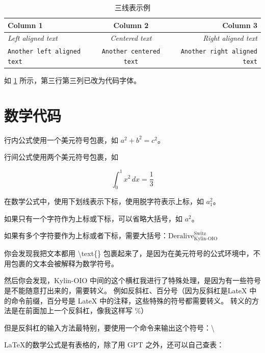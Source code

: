 \documentclass{article}
\begin{document}
\begin{table}[H]
    \centering
    \begin{tabular}{l c r}
        \toprule
        \textbf{Column 1}                  & \textbf{Column 2}              & \textbf{Column 3}                   \\
        \midrule
        \textit{Left aligned text}         & \textit{Centered text}         & \textit{Right aligned text}         \\
        \texttt{Another left aligned text} & \texttt{Another centered text} & \texttt{Another right aligned text} \\
        \bottomrule
    \end{tabular}
    \caption{三线表示例}
    \label{tab:my_table}
\end{table}

如 \ref{tab:my_table} 所示，第三行第三列已改为代码字体。

\section{数学代码}

行内公式使用一个美元符号包裹，如 $a^2 + b^2 = c^2$。

行间公式使用两个美元符号包裹，如

$$
    \int_{0}^{1} x^2 \, dx = \frac{1}{3}
$$

在数学公式中，使用下划线表示下标，使用脱字符表示上标，如 $a_{1}^{2}$。

如果只有一个字符作为上标或下标，可以省略大括号，如 $a^2$。

如果有多个字符要作为上标或者下标，需要大括号：$ \text{Deralive}_{\text{Kylin-OIO}}^{\text{Switz}} $

你会发现我把文本都用 \textbackslash text\{\} 包裹起来了，是因为在美元符号的公式环境中，不用包裹的文本会被解释为数学符号。

然后你会发现，Kylin-OIO 中间的这个横杠我进行了特殊处理，是因为有一些符号是不能随意打出来的，需要转义。
例如反斜杠、百分号（因为反斜杠是LateX 中的命令前缀，百分号是 LateX 中的注释，这些特殊的符号都需要转义。
转义的方法是在前面加上一个反斜杠，像我这样写 \%）

但是反斜杠的输入方法最特别，要使用一个命令来输出这个符号：\textbackslash

\LaTeX 的数学公式是有表格的，除了用 GPT 之外，还可以自己查表：
\end{document}
